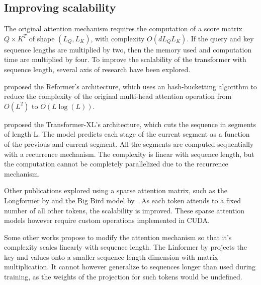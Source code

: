 \subsection{Improving scalability}

The original attention mechanism requires the computation of a score
matrix $Q \times K^T$ of shape $(L_Q, L_K)$, with complexity
$O(dL_QL_K)$. If the query and key sequence lengths are multiplied by
two, then the memory used and computation time are multiplied by four. To
improve the scalability of the transformer with sequence length, several axis of research have been explored.

\citet{kitaev2020reformer} proposed
the Reformer's architecture, which uses an hash-bucketting algorithm to
reduce the complexity of the original multi-head attention operation
from $O(L^2)$ to $O(L\log(L))$.

\citet{dai2019transformerxl} proposed the
Transformer-XL's architecture, which cuts the sequence in segments of
length L. The model predicts each stage of the current segment as a
function of the previous and current segment. All the segments are
computed sequentially with a recurrence mechanism. The complexity is linear
with sequence length, but the computation cannot be completely
 parallelized due to the recurrence mechanism.

Other publications explored using a sparse attention matrix, such as the
 Longformer by \citet{beltagy2020longformer} and the Big Bird model by
 \citet{zaheer2021big}. As each
token attends to a fixed number of all other tokens, the scalability is
improved. These sparse attention models however require custom
operations implemented in CUDA.

Some other works propose to modify the attention mechanism so that it's complexity scales linearly with sequence length. The Linformer by
\citet{wang2020linformer} projects the
 key and values onto a smaller sequence length dimension with matrix
 multiplication. It cannot however generalize to sequences longer than used
 during training, as the weights of the projection for such tokens would
 be undefined.

